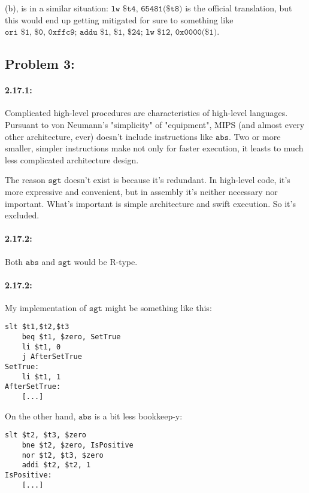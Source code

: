 \documentclass[a4paper]{article}
\begin{document}
(b), is in a similar situation: $\texttt{lw \$t4, 65481(\$t8)}$ is the official translation, but this would end up getting mitigated for sure to something like $\texttt{ori \$1, \$0, 0xffc9; addu \$1, \$1, \$24; lw \$12, 0x0000(\$1)}$.

\subsection*{Problem 3:}
\paragraph*{2.17.1:} Complicated high-level procedures are characteristics of high-level languages. Pursuant to von Neumann's "simplicity" of "equipment", MIPS (and almost every other architecture, ever) doesn't include instructions like $\texttt{abs}$. Two or more smaller, simpler instructions make not only for faster execution, it leasts to much less complicated architecture design.

The reason $\texttt{sgt}$ doesn't exist is because it's redundant. In high-level code, it's more expressive and convenient, but in assembly it's neither necessary nor important. What's important is simple architecture and swift execution. So it's excluded.

\paragraph*{2.17.2:} Both $\texttt{abs}$ and $\texttt{sgt}$ would be R-type.

\paragraph*{2.17.2:} My implementation of $\texttt{sgt}$ might be something like this:

\begin{Verbatim}[fontsize=\small]
	slt $t1,$t2,$t3
	beq $t1, $zero, SetTrue
	li $t1, 0
	j AfterSetTrue
SetTrue:
	li $t1, 1
AfterSetTrue:
	[...]
\end{Verbatim}

On the other hand, $\texttt{abs}$ is a bit less bookkeep-y:

\begin{Verbatim}[fontsize=\small]
	slt $t2, $t3, $zero
	bne $t2, $zero, IsPositive
	nor $t2, $t3, $zero
	addi $t2, $t2, 1
IsPositive:
	[...]
\end{Verbatim}
\end{document}
